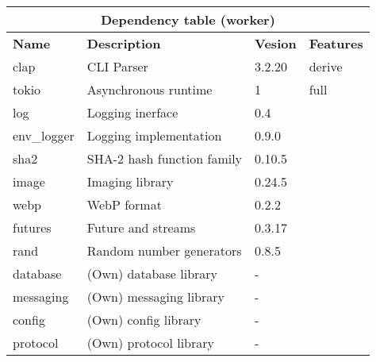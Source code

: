 \documentclass[../documentation.tex]{subfiles}
\begin{document}
\bgroup{}
\def\arraystretch{1.5}
\begin{center}
    \begin{tabular}{ |p{2cm}|p{4cm}|p{1.5cm}|p{2cm}| }
        \hline
        \multicolumn{4}{|c|}{\textbf{Dependency table (worker)}} \\
        \hline
        \textbf{Name} & \textbf{Description} & \textbf{Vesion} & \textbf{Features} \\
        \hline
        clap & CLI Parser & 3.2.20 & derive \\
        \hline
        tokio & Asynchronous runtime & 1 & full \\
        \hline
        log & Logging inerface & 0.4 & \\
        \hline
        env\_logger & Logging implementation & 0.9.0 & \\
        \hline
        sha2 & SHA-2 hash function family & 0.10.5 & \\
        \hline
        image & Imaging library & 0.24.5 & \\
        \hline
        webp & WebP format & 0.2.2 & \\
        \hline
        futures & Future and streams & 0.3.17 & \\
        \hline
        rand & Random number generators & 0.8.5 & \\
        \hline
        database & (Own) database library & - & \\
        \hline
        messaging & (Own) messaging library & - & \\
        \hline
        config & (Own) config library & - & \\
        \hline
        protocol & (Own) protocol library & - & \\
        \hline
    \end{tabular}
\end{center}
\egroup{}
\end{document}
